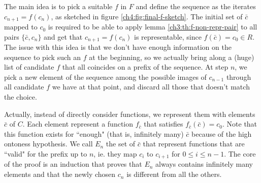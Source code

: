 \begin{figure*}[ht]
	\centering
	\caption{Graphical representation of the ``final" $f$}
	\label{ch4:fig:final-f-sketch}
\end{figure*}

The main idea is to pick a suitable $f$ in $F$ and define the sequence as the iterates $c_{n+1} = f(c_n)$, as sketched in figure \ref{ch4:fig:final-f-sketch}. The initial set of $\bar{c}$ mapped to $c_0$ is required to be able to apply lemma \ref{ch3:th:f-non-repr-pair} to all pairs $\{ \bar{c}, c_n \}$ and get that $c_{n+1} = f(c_n)$ is representable, since $f(\bar{c}) = c_0 \in R$.
The issue with this idea is that we don't have enough information on the sequence to pick such an $f$ at the beginning, so we actually bring along a (huge) list of candidate $f$ that all coincides on a prefix of the sequence. At step $n$, we pick a new element of the sequence among the possible images of $c_{n-1}$ through all candidate $f$ we have at that point, and discard all those that doesn't match the choice.

Actually, instead of directly consider functions, we represent them with elements $\bar{c}$ of $C$. Each element represent a function $f_{\bar{c}}$ that satisfies $f_{\bar{c}}(\bar{c}) = c_0$. Note that this function exists for ``enough" (that is, infinitely many) $\bar{c}$ because of the high ontoness hypothesis. We call $E_n$ the set of $\bar{c}$ that represent functions that are ``valid" for the prefix up to $n$, ie. they map $c_{i}$ to $c_{i+1}$ for $0 \le i \le n - 1$. The core of the proof is an induction that proves that $E_n$ always contains infinitely many elements and that the newly chosen $c_n$ is different from all the others.

